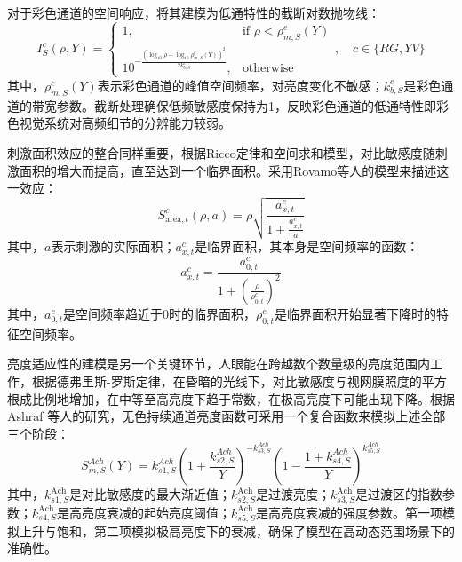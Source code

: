 对于彩色通道的空间响应，将其建模为低通特性的截断对数抛物线\cite{1-2-9}：
\begin{equation}
I_S^{c}(\rho, Y) = 
\begin{cases} 
1, & \text{if } \rho < \rho_{m,S}^{c}(Y) \\
10^{-\frac{\left(\log_{10}\rho - \log_{10}\rho_{m,S}^{c}(Y)\right)^2}{2k_{b,S}^{c}}}, & \text{otherwise}
\end{cases}, \quad c \in \{RG, YV\}
\label{eq:color_spatial_response}
\end{equation}
其中，\(\rho_{m,S}^{c}(Y)\)表示彩色通道的峰值空间频率，对亮度变化不敏感；\(k_{b,S}^{c}\)是彩色通道的带宽参数。截断处理确保低频敏感度保持为1，反映彩色通道的低通特性即彩色视觉系统对高频细节的分辨能力较弱。

刺激面积效应的整合同样重要，根据Ricco定律和空间求和模型，对比敏感度随刺激面积的增大而提高，直至达到一个临界面积。采用Rovamo等人的模型来描述这一效应\cite{3-2-8}：
\begin{equation}
S_{\text{area},t}^c(\rho, a) = \rho \sqrt{\frac{a_{x,t}^c}{1 + \frac{a_{x,t}^c}{a}}}
\label{eq:area_integration}
\end{equation}
其中，\(a\)表示刺激的实际面积；\(a_{x,t}^c\)是临界面积，其本身是空间频率的函数：
\begin{equation}
a_{x,t}^c = \frac{a_{0,t}^c}{1 + \left(\frac{\rho}{\rho_{0,t}^c}\right)^2}
\label{eq:critical_area}
\end{equation}
其中，\(a_{0,t}^c\)是空间频率趋近于0时的临界面积，\(\rho_{0,t}^c\)是临界面积开始显著下降时的特征空间频率。

亮度适应性的建模是另一个关键环节，人眼能在跨越数个数量级的亮度范围内工作，根据德弗里斯-罗斯定律，在昏暗的光线下，对比敏感度与视网膜照度的平方根成比例地增加，在中等至高亮度下趋于常数，在极高亮度下可能出现下降。根据Ashraf 等人的研究，无色持续通道亮度函数可采用一个复合函数来模拟上述全部三个阶段\cite{1-2-9}：
\begin{equation}
S_{m,S}^{Ach}(Y) = k_{s1,S}^{Ach} \left(1 + \frac{k_{s2,S}^{Ach}}{Y}\right)^{-k_{s3,S}^{Ach}} \left(1 - \frac{1 + k_{s4,S}^{Ach}}{Y}\right)^{k_{s5,S}^{Ach}}
\label{eq:ach_luminance_sustained}
\end{equation}
其中，\(k_{s1,S}^{\text{Ach}}\)是对比敏感度的最大渐近值；\(k_{s2,S}^{\text{Ach}}\)是过渡亮度；\(k_{s3,S}^{\text{Ach}}\)是过渡区的指数参数；\(k_{s4,S}^{\text{Ach}}\)是高亮度衰减的起始亮度阈值；\(k_{s5,S}^{\text{Ach}}\)是高亮度衰减的强度参数。第一项模拟上升与饱和，第二项模拟极高亮度下的衰减，确保了模型在高动态范围场景下的准确性。

